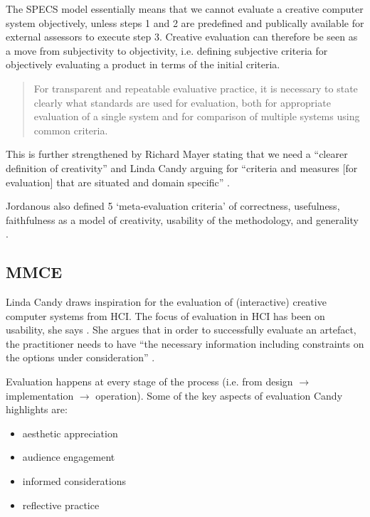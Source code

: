 The \ac{SPECS} model essentially means that we cannot evaluate a creative computer system objectively, unless steps 1 and 2 are predefined and publically available for external assessors to execute step 3. Creative evaluation can therefore be seen as a move from subjectivity to objectivity, i.e. defining subjective criteria for objectively evaluating a product in terms of the initial criteria.

\begin{quotation}
  For transparent and repeatable evaluative practice, it is necessary to state clearly what standards are used for evaluation, both for appropriate evaluation of a single system and for comparison of multiple systems using common criteria. 
\end{quotation}

This is further strengthened by Richard Mayer stating that we need a ``clearer definition of creativity'' \autocite*{Mayer1999} and Linda Candy arguing for ``criteria and measures [for evaluation] that are situated and domain specific'' \autocite*{Candy2012}.

Jordanous also defined 5 `meta-evaluation criteria' of correctness, usefulness, faithfulness as a model of creativity, usability of the methodology, and generality \autocite*{Jordanous2014}.


\subsection{MMCE}
\label{s:mmce}

Linda Candy draws inspiration for the evaluation of (interactive) creative computer systems from \ac{HCI}. The focus of evaluation in \ac{HCI} has been on usability, she says \autocite*{Candy2012}. She argues that in order to successfully evaluate an artefact, the practitioner needs to have ``the necessary information including constraints on the options under consideration'' \autocite*{Candy2012}.

Evaluation happens at every stage of the process (i.e. from design $\to$ implementation $\to$ operation). Some of the key aspects of evaluation Candy highlights are:

\begin{itemize}
  \item aesthetic appreciation
  \item audience engagement
  \item informed considerations
  \item reflective practice
\end{itemize}

